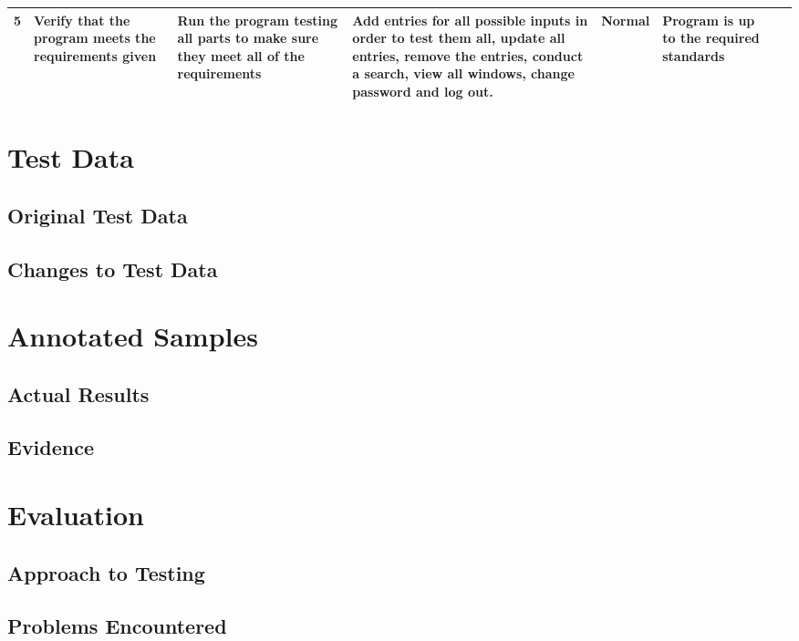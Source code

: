 \begin{landscape}
\begin{center}
\begin{longtable}{|p{1.5cm}|p{2cm}|p{2.5cm}|p{2.5cm}|p{2cm}|p{2cm}|p{2cm}|p{2cm}|}
        5 & Verify that the program meets the requirements given & Run the program testing all parts to make sure they meet all of the requirements & Add entries for all possible inputs in order to test them all, update all entries, remove the entries, conduct a search, view all windows, change password and log out. & Normal & Program is up to the required standards & & \\ \hline
    \end{longtable}
\end{center}

\section{Test Data}

\subsection{Original Test Data}

\subsection{Changes to Test Data}

\section{Annotated Samples}

\subsection{Actual Results}

\subsection{Evidence}

\end{landscape}

\section{Evaluation}

\subsection{Approach to Testing}

\subsection{Problems Encountered}

